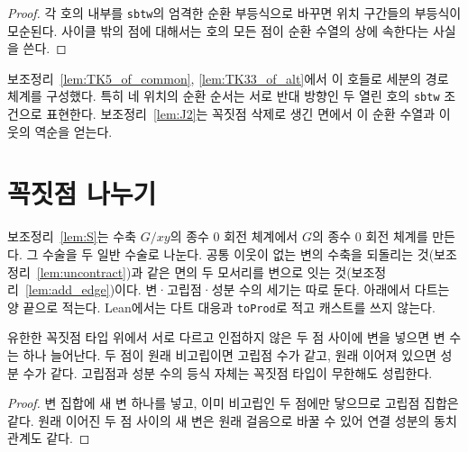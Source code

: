 \begin{proof}
\leanok
각 호의 내부를 \texttt{sbtw}의 엄격한 순환 부등식으로 바꾸면 위치 구간들의 부등식이 모순된다.
사이클 밖의 점에 대해서는 호의 모든 점이 순환 수열의 상에 속한다는 사실을 쓴다.
\end{proof}

보조정리~\ref{lem:TK5_of_common}, \ref{lem:TK33_of_alt}에서 이 호들로 세분의 경로 체계를 구성했다.
특히 네 위치의 순환 순서는 서로 반대 방향인 두 열린 호의 \texttt{sbtw} 조건으로 표현한다.
보조정리~\ref{lem:J2}는 꼭짓점 삭제로 생긴 면에서 이 순환 수열과 이웃의 역순을 얻는다.

\section{꼭짓점 나누기}

보조정리~\ref{lem:S}는 수축 \(G/xy\)의 종수 0 회전 체계에서 \(G\)의 종수 0 회전 체계를 만든다. 그 수술을
두 일반 수술로 나눈다. 공통 이웃이 없는 변의 수축을 되돌리는 것(보조정리~\ref{lem:uncontract})과 같은 면의
두 모서리를 변으로 잇는 것(보조정리~\ref{lem:add_edge})이다. 변·고립점·성분 수의 세기는 따로 둔다.
아래에서 다트는 양 끝으로 적는다. Lean에서는 다트 대응과 \texttt{toProd}로 적고 캐스트를 쓰지 않는다.

\begin{lemma}[변을 넣을 때의 세기]
\label{lem:edge_add_counts}
\leanok
유한한 꼭짓점 타입 위에서 서로 다르고 인접하지 않은 두 점 사이에 변을 넣으면 변 수는 하나 늘어난다.
두 점이 원래 비고립이면 고립점 수가 같고, 원래 이어져 있으면 성분 수가 같다.
고립점과 성분 수의 등식 자체는 꼭짓점 타입이 무한해도 성립한다.
\end{lemma}

\begin{proof}
\leanok
변 집합에 새 변 하나를 넣고, 이미 비고립인 두 점에만 닿으므로 고립점 집합은 같다.
원래 이어진 두 점 사이의 새 변은 원래 걸음으로 바꿀 수 있어 연결 성분의 동치 관계도 같다.
\end{proof}

